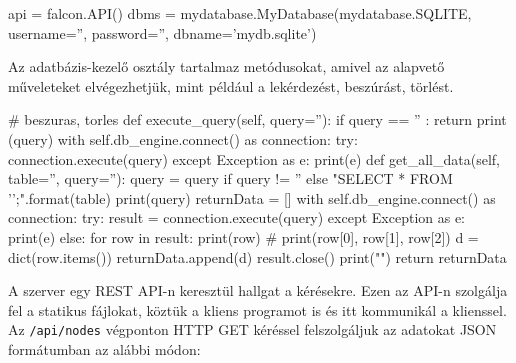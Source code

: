 \begin{python}
api = falcon.API()
dbms = mydatabase.MyDatabase(mydatabase.SQLITE, username='', password='', 
dbname='mydb.sqlite')
\end{python}

Az adatbázis-kezelő osztály tartalmaz metódusokat, amivel az alapvető műveleteket elvégezhetjük, mint például a lekérdezést, beszúrást, törlést.

\begin{python}
# beszuras, torles
    def execute_query(self, query=''):
            if query == '' : return
            print (query)
            with self.db_engine.connect() as connection:
                try:
                    connection.execute(query)
                except Exception as e:
                    print(e)
def get_all_data(self, table='', query=''):
            query = query if query != '' else "SELECT * 
FROM '{}';".format(table)
            print(query)
            returnData = []
            with self.db_engine.connect() as connection:
                try:
                    result = connection.execute(query)
                except Exception as e:
                    print(e)
                else:   
                    for row in result:
                        print(row) # print(row[0], row[1], row[2])
                        d = dict(row.items())
                        returnData.append(d)
                    result.close()
            print("\n")       
            return returnData
\end{python}

A szerver egy REST API-n keresztül hallgat a kérésekre. Ezen az API-n szolgálja fel a statikus fájlokat, köztük a kliens programot is és itt kommunikál a klienssel. Az \texttt{/api/nodes} végponton HTTP GET kéréssel felszolgáljuk az adatokat JSON formátumban az alábbi módon:

\begin{json}
\end{json}

